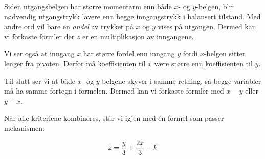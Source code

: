 \vskip 10pt

Siden utgangsbelgen har større momentarm enn både $x$- og $y$-belgen, blir nødvendig utgangstrykk lavere enn begge inngangstrykk i balansert tilstand. Med andre ord vil bare en {\it andel} av trykket på $x$ og $y$ vises på utgangen. Dermed kan vi forkaste formler der $z$ er en multiplikasjon av inngangene.

\vskip 10pt

Vi ser også at inngang $x$ har større fordel enn inngang $y$ fordi $x$-belgen sitter lenger fra pivoten. Derfor må koeffisienten til $x$ være større enn koeffisienten til $y$.

\vskip 10pt

Til slutt ser vi at både $x$- og $y$-belgene skyver i samme retning, så begge variabler må ha samme fortegn i formelen. Dermed kan vi forkaste formler med $x-y$ eller $y-x$.

\vskip 10pt

Når alle kriteriene kombineres, står vi igjen med én formel som passer mekanismen:

$$z = {y \over 3} + {2x \over 3} - k$$



